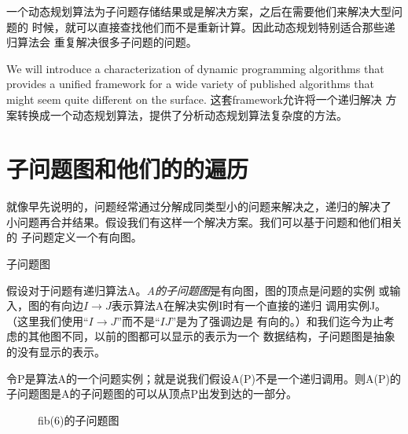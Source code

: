 一个动态规划算法为子问题存储结果或是解决方案，之后在需要他们来解决大型问题的
时候，就可以直接查找他们而不是重新计算。因此动态规划特别适合那些递归算法会
重复解决很多子问题的问题。

We will introduce a characterization of dynamic programming algorithms that
provides a unified framework for a wide variety of published algorithms that
might seem quite different on the surface. 这套framework允许将一个递归解决
方案转换成一个动态规划算法，提供了分析动态规划算法复杂度的方法。

\section{子问题图和他们的的遍历}\label{Sec:10_2}
就像早先说明的，问题经常通过分解成同类型小的问题来解决之，递归的解决了
小问题再合并结果。假设我们有这样一个解决方案。我们可以基于问题和他们相关的
子问题定义一个有向图。

\begin{definition}
子问题图

假设对于问题有递归算法A。\emph{A的子问题图}是有向图，图的顶点是问题的实例
或输入，图的有向边$I\rightarrow J$表示算法A在解决实例I时有一个直接的递归
调用实例J。（这里我们使用“$I\rightarrow J$”而不是“$IJ$”是为了强调边是
有向的。）和我们迄今为止考虑的其他图不同，以前的图都可以显示的表示为一个
数据结构，子问题图是抽象的没有显示的表示。

令P是算法A的一个问题实例；就是说我们假设A(P)不是一个递归调用。则A(P)的
子问题图是A的子问题图的可以从顶点P出发到达的一部分。
\end{definition}

\begin{figure*}[!t]
    \centering
    \caption{fib(6)的子问题图}
    \label{Fig:SubproblemgraphOfFib6}
\end{figure*}

